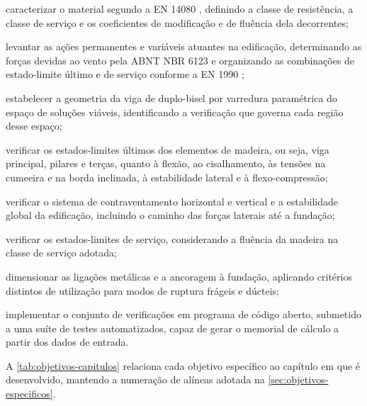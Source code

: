\begin{alineas}
    \item caracterizar o material segundo a EN 14080 \cite{EN14080:2013},
    definindo a classe de resistência, a classe de serviço e os coeficientes
    de modificação e de fluência dela decorrentes;

    \item levantar as ações permanentes e variáveis atuantes na edificação,
    determinando as forças devidas ao vento pela ABNT NBR 6123
    \cite{NBR6123:2023} e
    organizando as combinações de estado-limite último e de serviço conforme
    a EN 1990 \cite{EN1990:2002};

    \item estabelecer a geometria da viga de duplo-bisel por varredura
    paramétrica do espaço de soluções viáveis, identificando a verificação
    que governa cada região desse espaço;

    \item verificar os estados-limites últimos dos elementos de madeira,
    ou seja, viga principal, pilares e terças, quanto à flexão, ao cisalhamento, às
    tensões na cumeeira e na borda inclinada, à estabilidade lateral e à
    flexo-compressão;

    \item verificar o sistema de contraventamento horizontal e vertical e a
    estabilidade global da edificação, incluindo o caminho das forças
    laterais até a fundação;

    \item verificar os estados-limites de serviço, considerando a fluência da
    madeira na classe de serviço adotada;

    \item dimensionar as ligações metálicas e a ancoragem à fundação,
    aplicando critérios distintos de utilização para modos de ruptura frágeis
    e dúcteis;

    \item implementar o conjunto de verificações em programa de código aberto,
    submetido a uma suíte de testes automatizados, capaz de gerar o memorial
    de cálculo a partir dos dados de entrada.
\end{alineas}

A \autoref{tab:objetivos-capitulos} relaciona cada objetivo específico ao
capítulo em que é desenvolvido, mantendo a numeração de alíneas adotada na
\autoref{sec:objetivos-especificos}.

